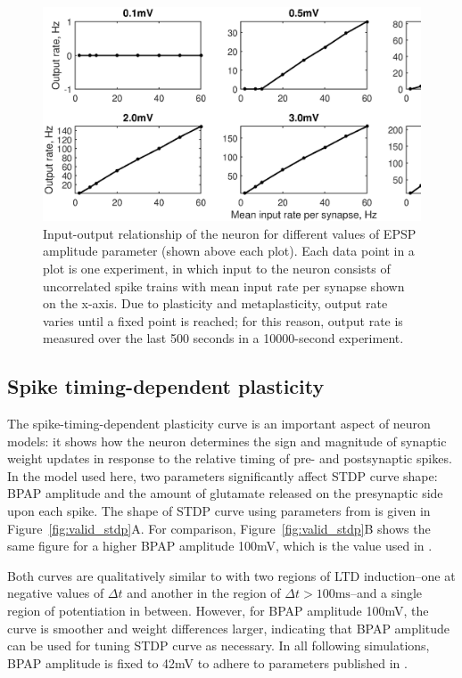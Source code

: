 \documentclass[a4paper,12pt]{report}
\theoremstyle{definition}
\begin{document}
\begin{figure}[h]
    \includegraphics[width=\textwidth]{figures/valid_iocurve_vs_epsp_grid.eps}
    \caption{Input-output relationship of the neuron for different values of EPSP amplitude parameter (shown above each plot). Each data point in a plot is one experiment, in which input to the neuron consists of uncorrelated spike trains with mean input rate per synapse shown on the x-axis. Due to plasticity and metaplasticity, output rate varies until a fixed point is reached; for this reason, output rate is measured over the last 500 seconds in a 10000-second experiment.}
    \label{fig:valid_iocurve_vs_epsp_grid}
\end{figure}




\subsection{Spike timing-dependent plasticity}

The spike-timing-dependent plasticity curve is an important aspect of neuron models: it shows how the neuron determines the sign and magnitude of  synaptic weight updates in response to the relative timing of pre- and postsynaptic spikes. In the model used here, two parameters significantly affect STDP curve shape: BPAP amplitude and the amount of glutamate released on the presynaptic side upon each spike. The shape of STDP curve using parameters from \cite{yeung2004synaptic} is given in Figure~\ref{fig:valid_stdp}A. For comparison, Figure~\ref{fig:valid_stdp}B shows the same figure for a higher BPAP amplitude 100mV, which is the value used in \cite{shouval2002unified}.

Both curves are qualitatively similar to \cite{shouval2002unified} with two regions of LTD induction--one at negative values of $\Delta t$ and another in the region of $\Delta t > 100\mathrm{ms}$--and a single region of potentiation in between. However, for BPAP amplitude 100mV, the curve is smoother and weight differences larger, indicating that BPAP amplitude can be used for tuning STDP curve as necessary. In all following simulations, BPAP amplitude is fixed to 42mV to adhere to parameters published in \cite{yeung2004synaptic}.
\end{document}
